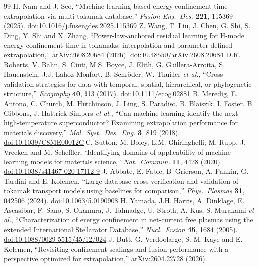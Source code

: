 \documentclass[aip,pop,preprint,amsmath,amssymb]{revtex4-2}
\begin{document}
\begin{thebibliography}{99}
 H. Nam and J. Seo, ``Machine learning based energy confinement
time extrapolation via multi-tokamak database,'' \emph{Fusion Eng.\ Des.}
\textbf{221}, 115369 (2025).
\href{https://doi.org/10.1016/j.fusengdes.2025.115369}{doi:10.1016/j.fusengdes.2025.115369}
 Z. Wang, T. Liu, J. Chen, G. Shi, S. Ding, Y. Shi and X. Zhang,
``Power-law-anchored residual learning
for H-mode energy confinement time in tokamaks: interpolation and
parameter-defined extrapolation,'' arXiv:2608.20684 (2026).
\href{https://doi.org/10.48550/arXiv.2608.20684}{doi:10.48550/arXiv.2608.20684}
 D.R. Roberts, V. Bahn, S. Ciuti, M.S. Boyce, J. Elith, G. Guillera-Arroita,
S. Hauenstein, J.J. Lahoz-Monfort, B. Schr\"{o}der, W. Thuiller \emph{et al.},
``Cross-validation strategies for
data with temporal, spatial, hierarchical, or phylogenetic structure,''
\emph{Ecography} \textbf{40}, 913 (2017).
\href{https://doi.org/10.1111/ecog.02881}{doi:10.1111/ecog.02881}
 B. Meredig, E. Antono, C. Church, M. Hutchinson, J. Ling, S. Paradiso,
B. Blaiszik, I. Foster, B. Gibbons, J. Hattrick-Simpers \emph{et al.},
``Can machine learning identify the
next high-temperature superconductor? Examining extrapolation performance for
materials discovery,'' \emph{Mol.\ Syst.\ Des.\ Eng.} \textbf{3}, 819 (2018).
\href{https://doi.org/10.1039/C8ME00012C}{doi:10.1039/C8ME00012C}
 C. Sutton, M. Boley, L.M. Ghiringhelli, M. Rupp, J. Vreeken and
M. Scheffler, ``Identifying domains of applicability
of machine learning models for materials science,'' \emph{Nat.\ Commun.}
\textbf{11}, 4428 (2020).
\href{https://doi.org/10.1038/s41467-020-17112-9}{doi:10.1038/s41467-020-17112-9}
 J. Abbate, E. Fable, B. Grierson, A. Pankin, G. Tardini and E. Kolemen,
``Large-database cross-verification
and validation of tokamak transport models using baselines for comparison,''
\emph{Phys.\ Plasmas} \textbf{31}, 042506 (2024).
\href{https://doi.org/10.1063/5.0190908}{doi:10.1063/5.0190908}
 H. Yamada, J.H. Harris, A. Dinklage, E. Ascasibar, F. Sano, S. Okamura,
J. Talmadge, U. Stroth, A. Kus, S. Murakami \emph{et al.}, ``Characterization of energy
confinement in net-current free plasmas using the extended International
Stellarator Database,'' \emph{Nucl.\ Fusion} \textbf{45}, 1684 (2005).
\href{https://doi.org/10.1088/0029-5515/45/12/024}{doi:10.1088/0029-5515/45/12/024}
 J. Butt, G. Verdoolaege, S. M. Kaye and E. Kolemen,
``Revisiting confinement scalings and fusion performance with a perspective
optimized for extrapolation,'' arXiv:2604.22728 (2026).

\end{thebibliography}
\end{document}
